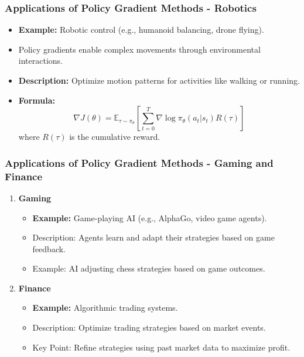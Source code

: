 \documentclass[aspectratio=169]{beamer}
\begin{document}
\begin{frame}[fragile]
  \frametitle{Applications of Policy Gradient Methods - Robotics}
  \begin{itemize}
    \item \textbf{Example:} Robotic control (e.g., humanoid balancing, drone flying).
    \item Policy gradients enable complex movements through environmental interactions.
    \item \textbf{Description:} Optimize motion patterns for activities like walking or running.
    \item \textbf{Formula:}
      \begin{equation}
      \nabla J(\theta) = \mathbb{E}_{\tau \sim \pi_\theta} \left[ \sum_{t=0}^{T} \nabla \log \pi_\theta(a_t | s_t) R(\tau) \right]
      \end{equation}
    where \( R(\tau) \) is the cumulative reward.
  \end{itemize}
\end{frame}

\begin{frame}[fragile]
  \frametitle{Applications of Policy Gradient Methods - Gaming and Finance}
  \begin{enumerate}
    \item \textbf{Gaming}
      \begin{itemize}
        \item \textbf{Example:} Game-playing AI (e.g., AlphaGo, video game agents).
        \item Description: Agents learn and adapt their strategies based on game feedback.
        \item Example: AI adjusting chess strategies based on game outcomes.
      \end{itemize}
    
    \item \textbf{Finance}
      \begin{itemize}
        \item \textbf{Example:} Algorithmic trading systems.
        \item Description: Optimize trading strategies based on market events.
        \item Key Point: Refine strategies using past market data to maximize profit.
      \end{itemize}
  \end{enumerate}
\end{frame}
\end{document}
